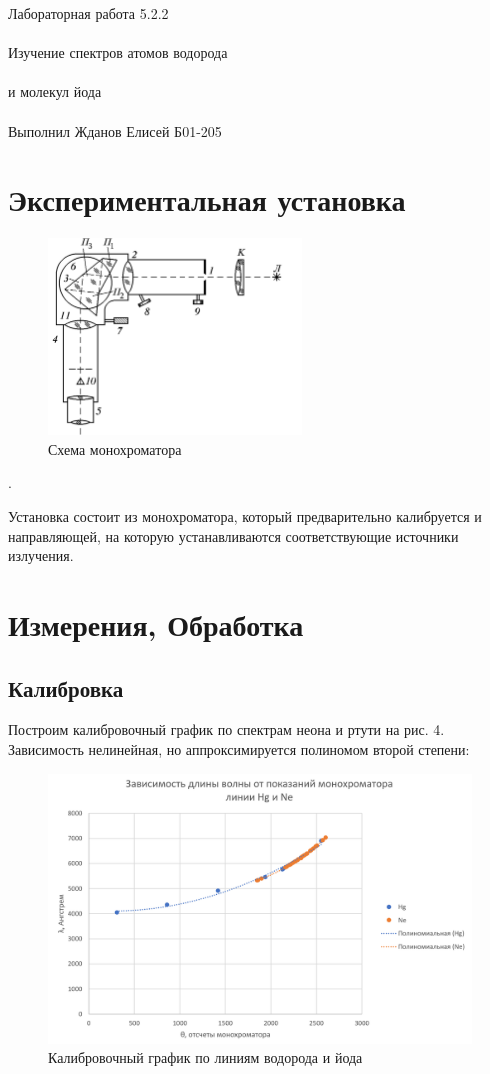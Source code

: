 \documentclass{astroedu-lab}
\begin{document}
\begin{problem}{\huge Лабораторная работа 5.2.2\\\\Изучение спектров атомов водорода\\\\и молекул йода\\\\Выполнил Жданов Елисей Б01-205}
\newpage

		
\section{Экспериментальная установка}
	
	\begin{figure}[!h]
		\centering
		\includegraphics[width=0.6\textwidth]{Screenshot_2}
		\caption{Схема монохроматора}
		\label{fig:screenshot2}
	\end{figure}
	
.

Установка состоит из монохроматора, который предварительно калибруется и направляющей, на которую устанавливаются соответствующие источники излучения.

\section{Измерения, Обработка}

\subsection{Калибровка}
	
	Построим калибровочный график по спектрам неона и ртути на рис. 4. Зависимость нелинейная, но аппроксимируется полиномом второй степени:
	
	\begin{figure}[!h]
		\centering
		\includegraphics[width=0.9\linewidth]{nehg}
		\caption{Калибровочный график по линиям водорода и йода}
		\label{fig:graph1}
	\end{figure}
	

\end{problem}
\end{document}
